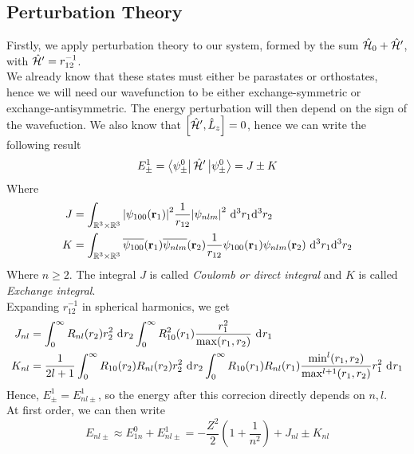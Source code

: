 \documentclass[../qm.tex]{subfiles}
\begin{document}
	\subsection{Perturbation Theory}
	Firstly, we apply perturbation theory to our system, formed by the sum $\hat{\mathcal{H}}_0+\hat{\mathcal{H}}'$, with $\hat{\mathcal{H}}'=r_{12}^{-1}$.\\
	We already know that these states must either be parastates or orthostates, hence we will need our wavefunction to be either exchange-symmetric or exchange-antisymmetric. The energy perturbation will then depend on the sign of the wavefuction. We also know that $\comm{\opr{\ham}'}{\opr{L}_z}=0$, hence we can write the following result
	\begin{equation}
		E_{\pm}^1=\bra{\psi^0_{\pm}}\opr{\ham}'\ket{\psi^0_{\pm}}=J\pm K
		\label{eq:energyplusminusexcited}
	\end{equation}
	Where
	\begin{equation}
		\begin{aligned}
			J&=\int_{\mathbb{R}^3\times\mathbb{R}^3}\abs{\psi_{100}(\vec{r}_1)}^2\frac{1}{r_{12}}\abs{\psi_{nlm}}^2\ddiff[3]{r_1}{r_2}\\
			K&=\int_{\mathbb{R}^3\times\mathbb{R}^3}\cc{\psi_{100}}(\vec{r}_1)\cc{\psi_{nlm}}(\vec{r}_2)\frac{1}{r_{12}}\psi_{100}(\vec{r}_1)\psi_{nlm}(\vec{r}_2)\ddiff[3]{r_1}{r_2}
		\end{aligned}
		\label{eq:jkintegrals}
	\end{equation}
	Where $n\ge2$. The integral $J$ is called \textit{Coulomb or direct integral} and $K$ is called \textit{Exchange integral}.\\
	Expanding $r_{12}^{-1}$ in spherical harmonics, we get
	\begin{equation}
		\begin{aligned}
			J_{nl}&=\int_{0}^{\infty}R_{nl}(r_2)r_2^2\diff{r_2}\int_{0}^{\infty}R_{10}^2(r_1)\frac{r_1^2}{\max(r_1,r_2)}\diff{r_1}\\
			K_{nl}&=\frac{1}{2l+1}\int_{0}^{\infty}R_{10}(r_2)R_{nl}(r_2)r^2_2\diff{r_2}\int_{0}^{\infty}R_{10}(r_1)R_{nl}(r_1)\frac{\min^l(r_1,r_2)}{\max^{l+1}(r_1,r_2)}r_1^2\diff{r_1}
		\end{aligned}
		\label{eq:jkcompleteshexpansion}
	\end{equation}
	Hence, $E_{\pm}^1=E_{nl\pm}^1$, so the energy after this correcion directly depends on $n,l$.\\
	At first order, we can then write
	\begin{equation}
		E_{nl\pm}\approx E_{1n}^0+E_{nl\pm}^1=-\frac{Z^2}{2}\left( 1+\frac{1}{n^2} \right)+J_{nl}\pm K_{nl}
		\label{eq:energyshiftjkintegrals}
	\end{equation}
\end{document}
